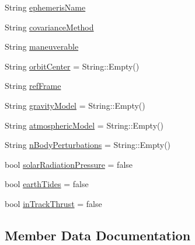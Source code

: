 \begin{DoxyCompactItemize}
\item 
String \hyperlink{structostk_1_1astro_1_1conjunction_1_1messages_1_1ccsds_1_1_c_d_m_1_1_metadata_a0c07d1d437162f4cb2c0e0ac9404e72c}{ephemeris\+Name}
\item 
String \hyperlink{structostk_1_1astro_1_1conjunction_1_1messages_1_1ccsds_1_1_c_d_m_1_1_metadata_aa75d6df4752331b1fdd080556fa602c6}{covariance\+Method}
\item 
String \hyperlink{structostk_1_1astro_1_1conjunction_1_1messages_1_1ccsds_1_1_c_d_m_1_1_metadata_af05d99ba66c816043e0fd1e25f050111}{maneuverable}
\item 
String \hyperlink{structostk_1_1astro_1_1conjunction_1_1messages_1_1ccsds_1_1_c_d_m_1_1_metadata_a850262b5d5528e0d4e871c747043f11f}{orbit\+Center} = String\+::\+Empty()
\item 
String \hyperlink{structostk_1_1astro_1_1conjunction_1_1messages_1_1ccsds_1_1_c_d_m_1_1_metadata_a1f7760be8ce00cf588146c557a7511b4}{ref\+Frame}
\item 
String \hyperlink{structostk_1_1astro_1_1conjunction_1_1messages_1_1ccsds_1_1_c_d_m_1_1_metadata_ac277170a570e49b737771b55005a9bb4}{gravity\+Model} = String\+::\+Empty()
\item 
String \hyperlink{structostk_1_1astro_1_1conjunction_1_1messages_1_1ccsds_1_1_c_d_m_1_1_metadata_a7c3419da001046c4d3b65072989dc563}{atmospheric\+Model} = String\+::\+Empty()
\item 
String \hyperlink{structostk_1_1astro_1_1conjunction_1_1messages_1_1ccsds_1_1_c_d_m_1_1_metadata_a938eed4b4146a7e02e24d37fb35d1e26}{n\+Body\+Perturbations} = String\+::\+Empty()
\item 
bool \hyperlink{structostk_1_1astro_1_1conjunction_1_1messages_1_1ccsds_1_1_c_d_m_1_1_metadata_a1f391661d25def1092b6051327e120cb}{solar\+Radiation\+Pressure} = false
\item 
bool \hyperlink{structostk_1_1astro_1_1conjunction_1_1messages_1_1ccsds_1_1_c_d_m_1_1_metadata_a059320ce7123670321382151ff465409}{earth\+Tides} = false
\item 
bool \hyperlink{structostk_1_1astro_1_1conjunction_1_1messages_1_1ccsds_1_1_c_d_m_1_1_metadata_ad5bded86c0fe3b4589f66c135d41016a}{in\+Track\+Thrust} = false
\end{DoxyCompactItemize}


\subsection{Member Data Documentation}
\mbox{\label{structostk_1_1astro_1_1conjunction_1_1messages_1_1ccsds_1_1_c_d_m_1_1_metadata_a7c3419da001046c4d3b65072989dc563}} 
